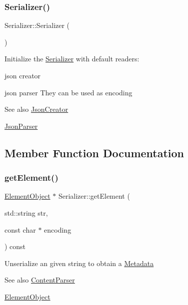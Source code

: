 \subsubsection{\texorpdfstring{Serializer()}{Serializer()}}
{\footnotesize\ttfamily Serializer\+::\+Serializer (\begin{DoxyParamCaption}{ }\end{DoxyParamCaption})}

Initialize the \mbox{\hyperlink{classSerializer}{Serializer}} with default readers\+:
\begin{DoxyItemize}
\item json creator
\item json parser They can be used as encoding \begin{DoxySeeAlso}{See also}
\mbox{\hyperlink{classJsonCreator}{Json\+Creator}} 

\mbox{\hyperlink{classJsonParser}{Json\+Parser}} 
\end{DoxySeeAlso}

\end{DoxyItemize}

\subsection{Member Function Documentation}
\mbox{\label{classSerializer_ab3bcdbd49167109de13e03878337018a}} 
\subsubsection{\texorpdfstring{get\+Element()}{getElement()}}
{\footnotesize\ttfamily \mbox{\hyperlink{classElementObject}{Element\+Object}} $\ast$ Serializer\+::get\+Element (\begin{DoxyParamCaption}\item[{std\+::string}]{str,  }\item[{const char $\ast$}]{encoding }\end{DoxyParamCaption}) const}

Unserialize an given string to obtain a \mbox{\hyperlink{classMetadata}{Metadata}} \begin{DoxySeeAlso}{See also}
\mbox{\hyperlink{classContentParser}{Content\+Parser}} 

\mbox{\hyperlink{classElementObject}{Element\+Object}}
\end{DoxySeeAlso}


